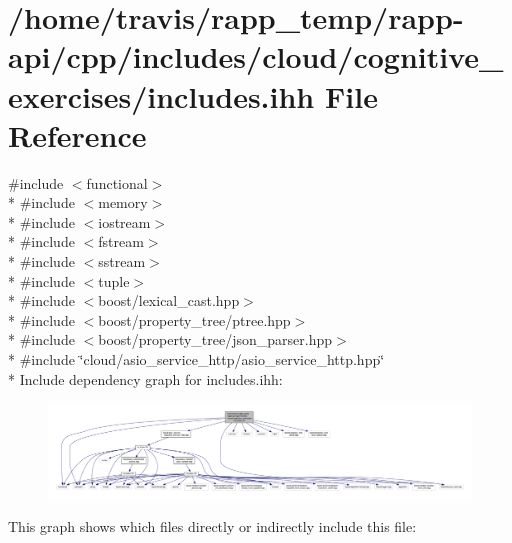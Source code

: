 \hypertarget{cloud_2cognitive__exercises_2includes_8ihh}{\section{/home/travis/rapp\-\_\-temp/rapp-\/api/cpp/includes/cloud/cognitive\-\_\-exercises/includes.ihh File Reference}
\label{cloud_2cognitive__exercises_2includes_8ihh}
}
{\ttfamily \#include $<$functional$>$}\\*
{\ttfamily \#include $<$memory$>$}\\*
{\ttfamily \#include $<$iostream$>$}\\*
{\ttfamily \#include $<$fstream$>$}\\*
{\ttfamily \#include $<$sstream$>$}\\*
{\ttfamily \#include $<$tuple$>$}\\*
{\ttfamily \#include $<$boost/lexical\-\_\-cast.\-hpp$>$}\\*
{\ttfamily \#include $<$boost/property\-\_\-tree/ptree.\-hpp$>$}\\*
{\ttfamily \#include $<$boost/property\-\_\-tree/json\-\_\-parser.\-hpp$>$}\\*
{\ttfamily \#include \char`\"{}cloud/asio\-\_\-service\-\_\-http/asio\-\_\-service\-\_\-http.\-hpp\char`\"{}}\\*
Include dependency graph for includes.\-ihh\-:
\nopagebreak
\begin{figure}[H]
\begin{center}
\leavevmode
\includegraphics[width=350pt]{cloud_2cognitive__exercises_2includes_8ihh__incl}
\end{center}
\end{figure}
This graph shows which files directly or indirectly include this file\-:
\nopagebreak
